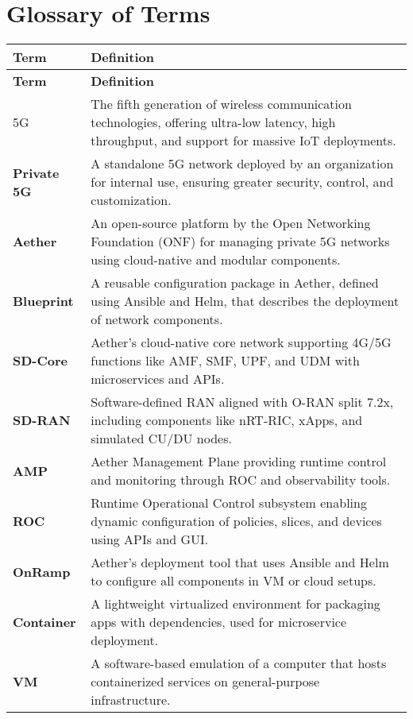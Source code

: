 \chapter*{Glossary of Terms}
\renewcommand{\arraystretch}{1.4}

\begin{longtable}{>{\bfseries}p{} p{}}
\toprule
\textbf{Term} & \textbf{Definition} \\
\midrule
\endfirsthead

\toprule
\textbf{Term} & \textbf{Definition} \\
\midrule
\endhead

\bottomrule
\endfoot

5G & The fifth generation of wireless communication technologies, offering ultra-low latency, high throughput, and support for massive IoT deployments. \\
Private 5G & A standalone 5G network deployed by an organization for internal use, ensuring greater security, control, and customization. \\
Aether & An open-source platform by the Open Networking Foundation (ONF) for managing private 5G networks using cloud-native and modular components. \\
Blueprint & A reusable configuration package in Aether, defined using Ansible and Helm, that describes the deployment of network components. \\
SD-Core & Aether’s cloud-native core network supporting 4G/5G functions like AMF, SMF, UPF, and UDM with microservices and APIs. \\
SD-RAN & Software-defined RAN aligned with O-RAN split 7.2x, including components like nRT-RIC, xApps, and simulated CU/DU nodes. \\
AMP & Aether Management Plane providing runtime control and monitoring through ROC and observability tools. \\
ROC & Runtime Operational Control subsystem enabling dynamic configuration of policies, slices, and devices using APIs and GUI. \\
OnRamp & Aether’s deployment tool that uses Ansible and Helm to configure all components in VM or cloud setups. \\
Container & A lightweight virtualized environment for packaging apps with dependencies, used for microservice deployment. \\
VM & A software-based emulation of a computer that hosts containerized services on general-purpose infrastructure. \\

\end{longtable}
